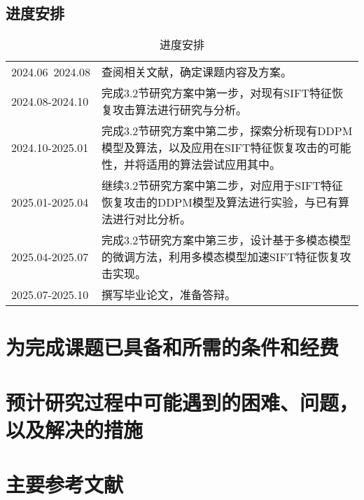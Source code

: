 \subsection{进度安排}
\begin{table}[h]
  \centering
  \caption{进度安排}\label{table3}
  \begin{tabularx}{0.8\textwidth}{lX}
    \toprule
    2024.06~2024.08 & 查阅相关文献，确定课题内容及方案。\\
    2024.08-2024.10 & 完成3.2节研究方案中第一步，对现有SIFT特征恢复攻击算法进行研究与分析。\\
    2024.10-2025.01	& 完成3.2节研究方案中第二步，探索分析现有DDPM模型及算法，以及应用在SIFT特征恢复攻击的可能性，并将适用的算法尝试应用其中。\\
    2025.01-2025.04 & 继续3.2节研究方案中第二步，对应用于SIFT特征恢复攻击的DDPM模型及算法进行实验，与已有算法进行对比分析。\\
    2025.04-2025.07 & 完成3.2节研究方案中第三步，设计基于多模态模型的微调方法，利用多模态模型加速SIFT特征恢复攻击实现。\\
    2025.07-2025.10 & 撰写毕业论文，准备答辩。\\
    \bottomrule
    \end{tabularx}
\end{table}
\section{为完成课题已具备和所需的条件和经费}
\section{预计研究过程中可能遇到的困难、问题，以及解决的措施}
\section{主要参考文献}



